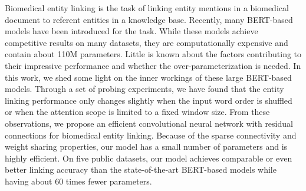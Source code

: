 Biomedical entity linking is the task of linking entity mentions in a biomedical document to referent entities in a knowledge base. Recently, many BERT-based models have been introduced for the task. While these models achieve competitive results on many datasets, they are computationally expensive and contain about 110M parameters. Little is known about the factors contributing to their impressive performance and whether the over-parameterization is needed. In this work, we shed some light on the inner workings of these large BERT-based models. Through a set of probing experiments, we have found that the entity linking performance only changes slightly when the input word order is shuffled or when the attention scope is limited to a fixed window size. From these observations, we propose an efficient convolutional neural network with residual connections for biomedical entity linking. Because of the sparse connectivity and weight sharing properties, our model has a small number of parameters and is highly efficient. On five public datasets, our model achieves comparable or even better linking accuracy than the state-of-the-art BERT-based models while having about 60 times fewer parameters.

